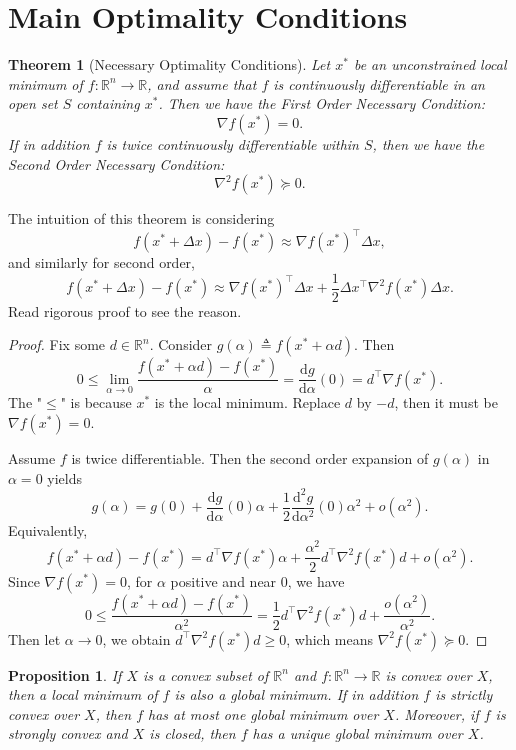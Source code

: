 \documentclass[12pt,a4paper]{article}
\numberwithin{equation}{section}
\theoremstyle{mystyle}
\newtheorem{theorem}[definition]{Theorem}
\newtheorem{proposition}[definition]{Proposition}
\newcommand{\R}{\mathbb{R}}
\newcommand{\grad}{\nabla}
\renewcommand{\d}{\mathrm{d}}
\newcommand{\T}{\top}
\begin{document}
	\section{Main Optimality Conditions}
	\begin{theorem}[Necessary Optimality Conditions]
		Let $x^*$ be an unconstrained local minimum of $f:\R^n \to \R$, and assume that $f$ is continuously differentiable in an open set $S$ containing $x^*$. Then we have the \emph{First Order Necessary Condition}:
		\begin{equation}
			\grad f(x^*)=0.
		\end{equation}
		If in addition $f$ is twice continuously differentiable within $S$, then we have the \emph{Second Order Necessary Condition}:
		\begin{equation}
			\grad^2 f(x^*)\succeq 0.
		\end{equation}
	\end{theorem}
	The intuition of this theorem is considering
	$$
	f(x^*+\Delta x)-f(x^*)\approx \grad f(x^*)^\T \Delta x,
	$$
	and similarly for second order,
	$$
	f(x^*+\Delta x)-f(x^*)\approx \grad f(x^*)^\T \Delta x +\frac{1}{2}\Delta x^\T \grad^2 f(x^*)\Delta x.
	$$
	Read rigorous proof to see the reason.
	\begin{proof}
		Fix some $d\in \R^n$. Consider $g(\alpha)\triangleq f(x^*+\alpha d)$. Then
		$$
		0\leq 
		\lim_{\alpha\to 0}\frac{f(x^*+\alpha d)-f(x^*)}{\alpha} 
		= \frac{\d g}{\d \alpha}(0)=d^\T \grad f(x^*).
		$$
		The "$\leq$" is because $x^*$ is the local minimum. Replace $d$ by $-d$, then it must be $\grad f(x^*)=0$.
		
		Assume $f$ is twice differentiable. Then the second order expansion of $g(\alpha)$ in $\alpha=0$ yields
		$$
		g(\alpha) = g(0) + \frac{\d g}{\d \alpha}(0)\alpha +
		\frac{1}{2} \frac{\d^2 g}{\d \alpha^2}(0) \alpha^2 + o(\alpha^2).
		$$
		Equivalently,
		$$
		f(x^*+\alpha d) - f(x^*) = d^\T \grad f(x^*)\alpha + \frac{\alpha^2}{2} d^\T \grad^2 f(x^*) d + o(\alpha^2).
		$$
		Since $\grad f(x^*)=0$, for $\alpha$ positive and near 0, we have
		$$
		0\leq \frac{f(x^*+\alpha d)-f(x^*)}{\alpha^2}= 
		\frac{1}{2} d^\T \grad^2 f(x^*) d + \frac{o(\alpha^2)}{\alpha^2}.
		$$
		Then let $\alpha\to 0$, we obtain $d^\T \grad^2 f(x^*) d\geq 0$, which means $\grad^2 f(x^*) \succeq 0$.
	\end{proof}
	
	\begin{proposition}
		If $X$ is a convex subset of $\R^n$ and $f:\R^n \to \R$ is convex over $X$, then a local minimum of $f$ is also a global minimum. If in addition $f$ is strictly convex over $X$, then $f$ has at most one global minimum over $X$. Moreover, if $f$ is strongly convex and $X$ is closed, then $f$ has a unique global minimum over $X$.
	\end{proposition}
	
\end{document}
